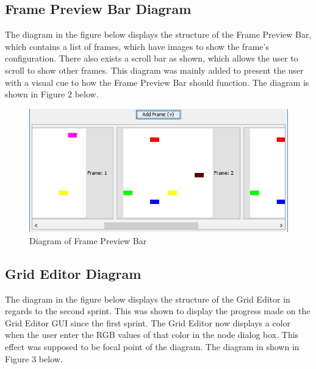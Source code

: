 \documentclass[12pt]{article}
\begin{document}
			\subsection {Frame Preview Bar Diagram}
			\forceindent The diagram in the figure below displays the structure of the Frame Preview Bar, which contains a list of frames, which have images to show the frame's configuration. There also exists a scroll bar as shown, which allows the user to scroll to show other frames. This diagram was mainly added to present the user with a visual cue to how the Frame Preview Bar should function. The diagram is shown in Figure 2 below.
			
			\begin{figure}[ht!]
				\centering
				\includegraphics[width=120mm]{potoFramePre.JPG}
				\caption{Diagram of Frame Preview Bar \label{overflow}}
			\end{figure}
			
			\subsection {Grid Editor Diagram}
			\forceindent The diagram in the figure below displays the structure of the Grid Editor in regards to the second sprint. This was shown to display the progress made on the Grid Editor GUI since the first sprint. The Grid Editor now displays a color when the user enter the RGB values of that color in the node dialog box. This effect was supposed to be focal point of the diagram. The diagram in shown in Figure 3 below.
			
\end{document}

